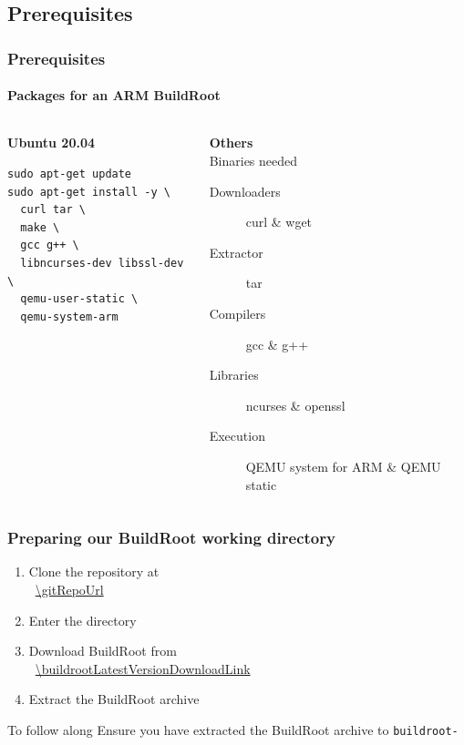 \subsection{Prerequisites}
\begin{frame}[fragile]
  \frametitle{Prerequisites}
  \framesubtitle{Packages for an ARM BuildRoot}
  \begin{columns}[t]
    \begin{column}{.5\textwidth}
      \textbf{Ubuntu 20.04}
      \begin{verbatim}
sudo apt-get update
sudo apt-get install -y \
  curl tar \
  make \
  gcc g++ \
  libncurses-dev libssl-dev \
  qemu-user-static \
  qemu-system-arm
      \end{verbatim}
    \end{column}
    \begin{column}{.5\textwidth}
      \textbf{Others} \\
      {\small Binaries needed}
      \begin{description}
        \item[Downloaders] curl \& wget
        \item[Extractor] tar
        \item[Compilers] gcc \& g++
        \item[Libraries] ncurses \& openssl
        \item[Execution] QEMU system for ARM \& QEMU static
      \end{description}
    \end{column}
  \end{columns}
\end{frame}
\begin{frame}
  \frametitle{Preparing our BuildRoot working directory}
  \begin{enumerate}
    \item Clone the repository at \\ \mbox{ \url{\gitRepoUrl} }
    \item Enter the directory
    \item Download BuildRoot from \\ \mbox{ \url{\buildrootLatestVersionDownloadLink} }
    \item Extract the BuildRoot archive
  \end{enumerate}
  \begin{alertblock}{To follow along}
    Ensure you have extracted the BuildRoot archive to \texttt{buildroot-\buildrootLatestVersion}
  \end{alertblock}
\end{frame}
